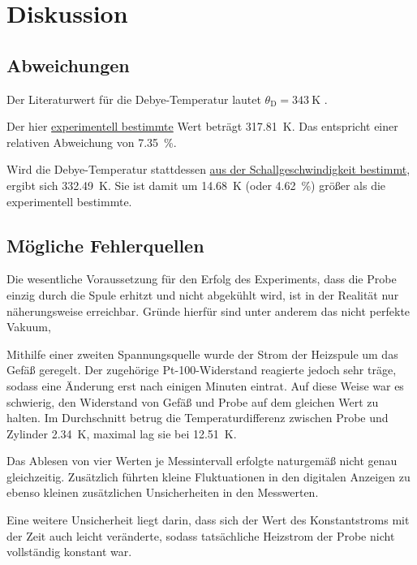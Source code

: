 \section{Diskussion}
\label{sec:diskussion}

\subsection{Abweichungen}

    Der Literaturwert für die Debye-Temperatur lautet $\theta_\text{D} = \SI{343}{\kelvin}$ \cite[Abbildung 6.9]{grossmarx}.

    Der hier \hyperref[sec:auswertung:debye_exp]{experimentell bestimmte} Wert beträgt \SI{317.81}{\kelvin}.
    Das entspricht einer relativen Abweichung von \SI{7.35}{\percent}.

    Wird die Debye-Temperatur stattdessen \hyperref[sec:auswertung:debye_vs]{aus der Schallgeschwindigkeit bestimmt},
    ergibt sich \SI{332.49}{\kelvin}.
    Sie ist damit um \SI{14.68}{\kelvin} (oder \SI{4.62}{\percent}) größer als die experimentell bestimmte.


\subsection{Mögliche Fehlerquellen}


    Die wesentliche Voraussetzung für den Erfolg des Experiments,
    dass die Probe einzig durch die Spule erhitzt und nicht abgekühlt wird,
    ist in der Realität nur näherungsweise erreichbar.
    Gründe hierfür sind unter anderem
    das nicht perfekte Vakuum,

    Mithilfe einer zweiten Spannungsquelle wurde der Strom der Heizspule um das Gefäß geregelt.
    Der zugehörige Pt-100-Widerstand reagierte jedoch sehr träge,
    sodass eine Änderung erst nach einigen Minuten eintrat.
    Auf diese Weise war es schwierig,
    den Widerstand von Gefäß und Probe auf dem gleichen Wert zu halten.
    Im Durchschnitt betrug die Temperaturdifferenz zwischen Probe und Zylinder \SI{2.34}{\kelvin},
    maximal lag sie bei \SI{12.51}{\kelvin}.

    Das Ablesen von vier Werten je Messintervall erfolgte naturgemäß nicht genau gleichzeitig.
    Zusätzlich führten kleine Fluktuationen in den digitalen Anzeigen
    zu ebenso kleinen zusätzlichen Unsicherheiten in den Messwerten.

    Eine weitere Unsicherheit liegt darin,
    dass sich der Wert des Konstantstroms mit der Zeit auch leicht veränderte,
    sodass tatsächliche Heizstrom der Probe nicht vollständig konstant war.
